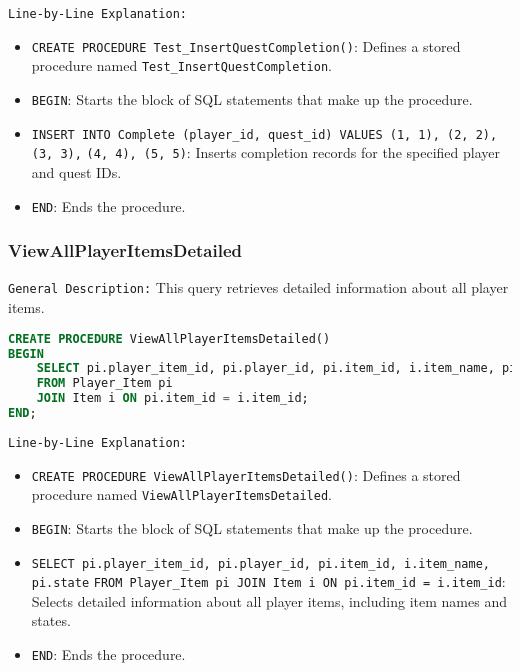 \documentclass{article}
\begin{document}
\texttt{Line-by-Line Explanation:}
\begin{itemize}
    \item \lstinline|CREATE PROCEDURE Test_InsertQuestCompletion()|: Defines a stored procedure named \linebreak \lstinline|Test_InsertQuestCompletion|.
    \item \lstinline|BEGIN|: Starts the block of SQL statements that make up the procedure.
    \item \lstinline|INSERT INTO Complete (player_id, quest_id) VALUES (1, 1), (2, 2), (3, 3),| \linebreak \lstinline|(4, 4), (5, 5)|: Inserts completion records for the specified player and quest IDs.
    \item \lstinline|END|: Ends the procedure.
\end{itemize}

\subsubsection{ViewAllPlayerItemsDetailed}

\texttt{General Description:} This query retrieves detailed information about all player items.

\begin{lstlisting}[language=SQL]
CREATE PROCEDURE ViewAllPlayerItemsDetailed()
BEGIN
    SELECT pi.player_item_id, pi.player_id, pi.item_id, i.item_name, pi.state
    FROM Player_Item pi
    JOIN Item i ON pi.item_id = i.item_id;
END;
\end{lstlisting}

\texttt{Line-by-Line Explanation:}
\begin{itemize}
    \item \lstinline|CREATE PROCEDURE ViewAllPlayerItemsDetailed()|: Defines a stored procedure named \linebreak \lstinline|ViewAllPlayerItemsDetailed|.
    \item \lstinline|BEGIN|: Starts the block of SQL statements that make up the procedure.
    \item \lstinline|SELECT pi.player_item_id, pi.player_id, pi.item_id, i.item_name, pi.state| \linebreak \lstinline|FROM Player_Item pi JOIN Item i ON pi.item_id = i.item_id|: Selects detailed information about all player items, including item names and states.
    \item \lstinline|END|: Ends the procedure.
\end{itemize}
\end{document}
